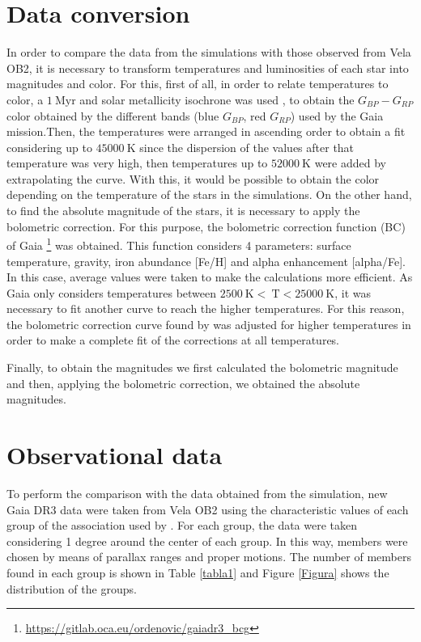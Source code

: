 \documentclass[baaa]{baaa}
\begin{document}
\section{Data conversion}
In order to compare the data from the simulations with those observed from Vela OB2, it is necessary to transform temperatures and luminosities of each star into magnitudes and color.
For this, first of all, in order to relate temperatures to color, a $1~\mathrm{Myr}$ and solar metallicity isochrone was used \citep{iso}, to obtain the $G_{BP}- G_{RP}$ color obtained by the different bands (blue $G_{BP}$, red $G_{RP}$) used by the Gaia mission.Then, the temperatures were arranged in ascending order to obtain a fit considering up to $45000~\mathrm{K}$ since the dispersion of the values after that temperature was very high, then temperatures up to $52000~\mathrm{K}$ were added by extrapolating the curve. With this, it would be possible to obtain the color depending on the temperature of the stars in the simulations.
On the other hand, to find the absolute magnitude of the stars, it is necessary to apply the bolometric correction. For this purpose, the bolometric correction function (BC) of Gaia \footnote{\url{https://gitlab.oca.eu/ordenovic/gaiadr3\_bcg}} was obtained. This function considers 4 parameters: surface temperature, gravity, iron abundance [Fe/H] and alpha enhancement [alpha/Fe]. In this case, average values were taken to make the calculations more efficient.
As Gaia only considers temperatures between $2500~\mathrm{K}<~\mathrm{T}<  25000~\mathrm{K}$, it was necessary to fit another curve to reach the higher temperatures. For this reason, the bolometric correction curve found by \cite{flower} was adjusted for higher temperatures in order to make a complete fit of the corrections at all temperatures.

Finally, to obtain the magnitudes we first calculated the bolometric magnitude and then, applying the bolometric correction, we obtained the absolute magnitudes.


\section{Observational data}
To perform the comparison with the data obtained from the simulation, new Gaia DR3 data were taken from Vela OB2 using the characteristic values of each group of the association used by \cite{cantat}. For each group, the data were taken considering 1 degree around the center of each group. In this way, members were chosen by means of parallax ranges and proper motions. The number of members found in each group is shown in Table \ref{tabla1} and Figure \ref{Figura} shows the distribution of the groups.
\end{document}
